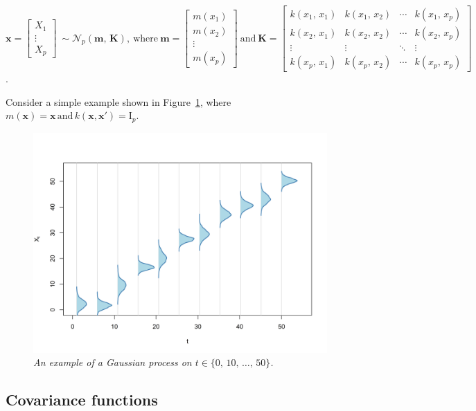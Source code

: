 \documentclass[a4paper, 10pt]{article}
\begin{document}
\begin{flushleft}
   $\mathbf{x} =
   \begin{bmatrix}
      X_{1} \\
      \vdots \\
      X_{p}
   \end{bmatrix}
   \:
   \sim \mathcal{N}_{p}(\mathbf{m}, \, \mathbf{K}),
   \:
   \text{where}
   \:
   \mathbf{m} = 
   \begin{bmatrix}
      m(x_{1}) \\
      m(x_{2}) \\
      \vdots \\
      m(x_{p})
   \end{bmatrix}  
   \: 
   \text{and}
   \:
   \mathbf{K} = 
   \begin{bmatrix}
      k(x_{1}, \, x_{1}) & k(x_{1}, \, x_{2}) & \cdots & k(x_{1}, \, x_{p}) \\
      k(x_{2}, \, x_{1}) & k(x_{2}, \, x_{2}) & \cdots & k(x_{2}, \, x_{p}) \\
      \vdots & \vdots & \ddots & \vdots \\
      k(x_{p}, \, x_{1}) & k(x_{p}, \, x_{2}) & \cdots & k(x_{p}, \, x_{p})
   \end{bmatrix}$.
   
   \vspace{1em}

   Consider a simple example shown in Figure~\ref{figure_1}, where $m(\mathbf{x}) = \mathbf{x} \, \text{and} \, k(\mathbf{x}, \mathbf{x}') = \text{I}_{p}$. 

   \begin{figure}[H]
      \centering
      \includegraphics[width=0.48\linewidth]{../img/gp.png}
      \caption{\textit{An example of a Gaussian process on $t \in \{0, \, 10, \, \ldots, \, 50\}$.}}
      \label{figure_1}
   \end{figure}

   \subsection*{Covariance functions}


\end{flushleft}
\end{document}
